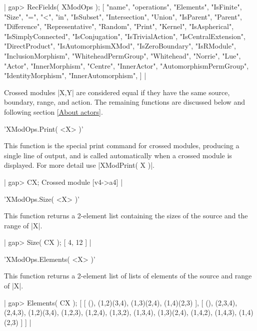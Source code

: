 |    gap> RecFields( XModOps );
    [ "name", "operations", "Elements", "IsFinite", "Size", "=", "<", 
      "in", "IsSubset", "Intersection", "Union", "IsParent", "Parent", 
      "Difference", "Representative", "Random", "Print", "Kernel", 
      "IsAspherical", "IsSimplyConnected", "IsConjugation", 
      "IsTrivialAction", "IsCentralExtension", "DirectProduct", 
      "IsAutomorphismXMod", "IsZeroBoundary", "IsRModule",
      "InclusionMorphism", "WhiteheadPermGroup", "Whitehead", "Norrie",
      "Lue", "Actor", "InnerMorphism", "Centre", "InnerActor",
       "AutomorphismPermGroup", "IdentityMorphism", "InnerAutomorphism", ] |

Crossed modules  |X,Y|  are considered equal if they have the same
source, boundary, range, and action.
The remaining functions are discussed below and following section
\ref{About actors}.

%

'XModOps.Print( <X> )'

This function is the special print command for crossed modules,
producing a single line of output, 
and is called automatically when a crossed module is displayed.
For more detail use |XModPrint( X )|.

|    gap> CX;
    Crossed module [v4->a4] | 

%

'XModOps.Size( <X> )'

This function returns a 2-element list containing the sizes 
of the source and the range of |X|.

|    gap> Size( CX );
    [ 4, 12 ] | 

%

'XModOps.Elements( <X> )'

This function returns a 2-element list of lists of elements
of the source and range of |X|.

|    gap> Elements( CX );
    [ [ (), (1,2)(3,4), (1,3)(2,4), (1,4)(2,3) ],
      [ (), (2,3,4), (2,4,3), (1,2)(3,4), (1,2,3), (1,2,4), (1,3,2),
        (1,3,4), (1,3)(2,4), (1,4,2), (1,4,3), (1,4)(2,3) ] ]   | 

%

